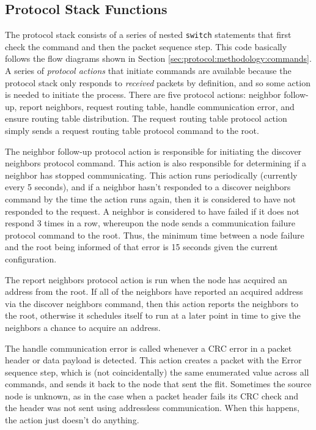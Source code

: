 \subsection{Protocol Stack Functions}\label{sec:protocol:implementation:protocol_stack}

The protocol stack consists of a series of nested \lstinline$switch$ statements that first check the command and then the packet sequence step. This code basically follows the flow diagrams shown in Section \ref{sec:protocol:methodology:commands}. A series of \emph{protocol actions} that initiate commands are available because the protocol stack only responds to \emph{received} packets by definition, and so some action is needed to initiate the process. There are five protocol actions: neighbor follow-up, report neighbors, request routing table, handle communication error, and ensure routing table distribution. The request routing table protocol action simply sends a request routing table protocol command to the root.

The neighbor follow-up protocol action is responsible for initiating the discover neighbors protocol command. This action is also responsible for determining if a neighbor has stopped communicating. This action runs periodically (currently every 5 seconds), and if a neighbor hasn't responded to a discover neighbors command by the time the action runs again, then it is considered to have not responded to the request. A neighbor is considered to have failed if it does not respond 3 times in a row, whereupon the node sends a communication failure protocol command to the root. Thus, the minimum time between a node failure and the root being informed of that error is 15 seconds given the current configuration.

The report neighbors protocol action is run when the node has acquired an address from the root. If all of the neighbors have reported an acquired address via the discover neighbors command, then this action reports the neighbors to the root, otherwise it schedules itself to run at a later point in time to give the neighbors a chance to acquire an address. 

The handle communication error is called whenever a CRC error in a packet header or data payload is detected. This action creates a packet with the Error sequence step, which is (not coincidentally) the same enumerated value across all commands, and sends it back to the node that sent the flit. Sometimes the source node is unknown, as in the case when a packet header fails its CRC check and the header was not sent using addressless communication. When this happens, the action just doesn't do anything.

